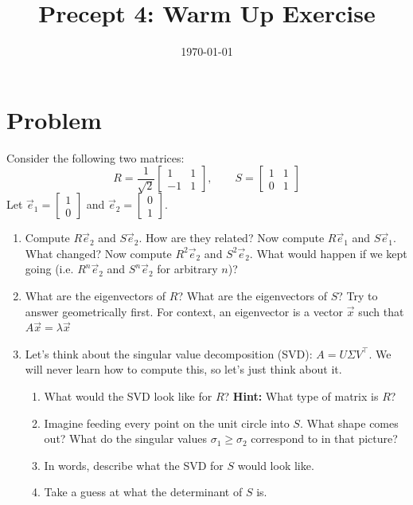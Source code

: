 \documentclass[11pt]{article}
\title{Precept 4: Warm Up Exercise}
\date{\today}
\begin{document}
\maketitle
\thispagestyle{fancy}

\section*{Problem}
Consider the following two matrices:
\[
R=\frac{1}{\sqrt{2}}\begin{bmatrix}
    1 & 1\\-1 & 1
\end{bmatrix},\qquad S=\begin{bmatrix}
    1 & 1\\0 & 1
\end{bmatrix}
\]
Let $\vec{e}_1=\begin{bmatrix}1\\0\end{bmatrix}$ and $\vec{e}_2=\begin{bmatrix}0\\1\end{bmatrix}$.
\begin{enumerate}
    \item Compute $R\vec{e}_2$ and $S\vec{e}_2$. How are they related? Now compute $R\vec{e}_1$ and $S\vec{e}_1$. What changed? Now compute $R^2\vec{e}_2$ and $S^2\vec{e}_2$. What would happen if we kept going (i.e. $R^n\vec{e}_2$ and $S^n\vec{e}_2$ for arbitrary $n$)?
    \item What are the eigenvectors of $R$? What are the eigenvectors of $S$? Try to answer geometrically first. For context, an eigenvector is a vector $\vec{x}$ such that $A\vec{x}=\lambda \vec{x}$
    \item Let's think about the singular value decomposition (SVD): $A=U\Sigma V^\top$. We will never learn how to compute this, so let's just think about it.
    \begin{enumerate}
        \item What would the SVD look like for $R$? \textbf{Hint:} What type of matrix is $R$?
        \item Imagine feeding every point on the unit circle into $S$. What shape comes out? What do the singular values $\sigma_1\geq\sigma_2$ correspond to in that picture?
        \item In words, describe what the SVD for $S$ would look like.
        \item Take a guess at what the determinant of $S$ is.
    \end{enumerate}
\end{enumerate}
\end{document}
